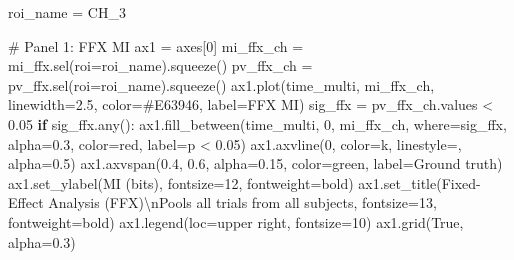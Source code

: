 \documentclass[
  11pt,
  letterpaper,
  oneside,
  openany]{book}
\newenvironment{Shaded}{\begin{snugshade}}{\end{snugshade}}
\newcommand{\BuiltInTok}[1]{\textcolor[rgb]{0.00,0.23,0.31}{#1}}
\newcommand{\CharTok}[1]{\textcolor[rgb]{0.13,0.47,0.30}{#1}}
\newcommand{\CommentTok}[1]{\textcolor[rgb]{0.37,0.37,0.37}{#1}}
\newcommand{\ControlFlowTok}[1]{\textcolor[rgb]{0.00,0.23,0.31}{\textbf{#1}}}
\newcommand{\DecValTok}[1]{\textcolor[rgb]{0.68,0.00,0.00}{#1}}
\newcommand{\FloatTok}[1]{\textcolor[rgb]{0.68,0.00,0.00}{#1}}
\newcommand{\NormalTok}[1]{\textcolor[rgb]{0.00,0.23,0.31}{#1}}
\newcommand{\OperatorTok}[1]{\textcolor[rgb]{0.37,0.37,0.37}{#1}}
\newcommand{\StringTok}[1]{\textcolor[rgb]{0.13,0.47,0.30}{#1}}
\newcommand{\VariableTok}[1]{\textcolor[rgb]{0.07,0.07,0.07}{#1}}
\begin{document}
\begin{Shaded}
\begin{Highlighting}[]
\NormalTok{roi\_name }\OperatorTok{=} \StringTok{\textquotesingle{}CH\_3\textquotesingle{}}

\CommentTok{\# Panel 1: FFX MI}
\NormalTok{ax1 }\OperatorTok{=}\NormalTok{ axes[}\DecValTok{0}\NormalTok{]}
\NormalTok{mi\_ffx\_ch }\OperatorTok{=}\NormalTok{ mi\_ffx.sel(roi}\OperatorTok{=}\NormalTok{roi\_name).squeeze()}
\NormalTok{pv\_ffx\_ch }\OperatorTok{=}\NormalTok{ pv\_ffx.sel(roi}\OperatorTok{=}\NormalTok{roi\_name).squeeze()}
\NormalTok{ax1.plot(time\_multi, mi\_ffx\_ch, linewidth}\OperatorTok{=}\FloatTok{2.5}\NormalTok{, color}\OperatorTok{=}\StringTok{\textquotesingle{}\#E63946\textquotesingle{}}\NormalTok{, label}\OperatorTok{=}\StringTok{\textquotesingle{}FFX MI\textquotesingle{}}\NormalTok{)}
\NormalTok{sig\_ffx }\OperatorTok{=}\NormalTok{ pv\_ffx\_ch.values }\OperatorTok{\textless{}} \FloatTok{0.05}
\ControlFlowTok{if}\NormalTok{ sig\_ffx.}\BuiltInTok{any}\NormalTok{():}
\NormalTok{    ax1.fill\_between(time\_multi, }\DecValTok{0}\NormalTok{, mi\_ffx\_ch, where}\OperatorTok{=}\NormalTok{sig\_ffx, }
\NormalTok{                     alpha}\OperatorTok{=}\FloatTok{0.3}\NormalTok{, color}\OperatorTok{=}\StringTok{\textquotesingle{}red\textquotesingle{}}\NormalTok{, label}\OperatorTok{=}\StringTok{\textquotesingle{}p \textless{} 0.05\textquotesingle{}}\NormalTok{)}
\NormalTok{ax1.axvline(}\DecValTok{0}\NormalTok{, color}\OperatorTok{=}\StringTok{\textquotesingle{}k\textquotesingle{}}\NormalTok{, linestyle}\OperatorTok{=}\StringTok{\textquotesingle{}{-}{-}\textquotesingle{}}\NormalTok{, alpha}\OperatorTok{=}\FloatTok{0.5}\NormalTok{)}
\NormalTok{ax1.axvspan(}\FloatTok{0.4}\NormalTok{, }\FloatTok{0.6}\NormalTok{, alpha}\OperatorTok{=}\FloatTok{0.15}\NormalTok{, color}\OperatorTok{=}\StringTok{\textquotesingle{}green\textquotesingle{}}\NormalTok{, label}\OperatorTok{=}\StringTok{\textquotesingle{}Ground truth\textquotesingle{}}\NormalTok{)}
\NormalTok{ax1.set\_ylabel(}\StringTok{\textquotesingle{}MI (bits)\textquotesingle{}}\NormalTok{, fontsize}\OperatorTok{=}\DecValTok{12}\NormalTok{, fontweight}\OperatorTok{=}\StringTok{\textquotesingle{}bold\textquotesingle{}}\NormalTok{)}
\NormalTok{ax1.set\_title(}\StringTok{\textquotesingle{}Fixed{-}Effect Analysis (FFX)}\CharTok{\textbackslash{}n}\StringTok{Pools all trials from all subjects\textquotesingle{}}\NormalTok{, }
\NormalTok{              fontsize}\OperatorTok{=}\DecValTok{13}\NormalTok{, fontweight}\OperatorTok{=}\StringTok{\textquotesingle{}bold\textquotesingle{}}\NormalTok{)}
\NormalTok{ax1.legend(loc}\OperatorTok{=}\StringTok{\textquotesingle{}upper right\textquotesingle{}}\NormalTok{, fontsize}\OperatorTok{=}\DecValTok{10}\NormalTok{)}
\NormalTok{ax1.grid(}\VariableTok{True}\NormalTok{, alpha}\OperatorTok{=}\FloatTok{0.3}\NormalTok{)}


\end{Highlighting}
\end{Shaded}
\end{document}
